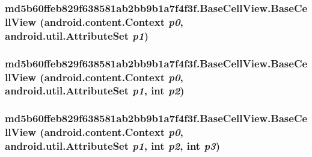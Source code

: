 \hypertarget{classmd5b60ffeb829f638581ab2bb9b1a7f4f3f_1_1_base_cell_view_8c64775ade9cdc20316e9b64a710eb0f}{
\subsubsection[{BaseCellView}]{\setlength{\rightskip}{0pt plus 5cm}md5b60ffeb829f638581ab2bb9b1a7f4f3f.BaseCellView.BaseCellView (android.content.Context {\em p0}, \/  android.util.AttributeSet {\em p1})}}
\label{classmd5b60ffeb829f638581ab2bb9b1a7f4f3f_1_1_base_cell_view_8c64775ade9cdc20316e9b64a710eb0f}


\hypertarget{classmd5b60ffeb829f638581ab2bb9b1a7f4f3f_1_1_base_cell_view_fad241accb4e748807ae00d69c3fc2c3}{
\subsubsection[{BaseCellView}]{\setlength{\rightskip}{0pt plus 5cm}md5b60ffeb829f638581ab2bb9b1a7f4f3f.BaseCellView.BaseCellView (android.content.Context {\em p0}, \/  android.util.AttributeSet {\em p1}, \/  int {\em p2})}}
\label{classmd5b60ffeb829f638581ab2bb9b1a7f4f3f_1_1_base_cell_view_fad241accb4e748807ae00d69c3fc2c3}


\hypertarget{classmd5b60ffeb829f638581ab2bb9b1a7f4f3f_1_1_base_cell_view_0b1897543fcf568d3917ac5b35f7806b}{
\subsubsection[{BaseCellView}]{\setlength{\rightskip}{0pt plus 5cm}md5b60ffeb829f638581ab2bb9b1a7f4f3f.BaseCellView.BaseCellView (android.content.Context {\em p0}, \/  android.util.AttributeSet {\em p1}, \/  int {\em p2}, \/  int {\em p3})}}
\label{classmd5b60ffeb829f638581ab2bb9b1a7f4f3f_1_1_base_cell_view_0b1897543fcf568d3917ac5b35f7806b}





